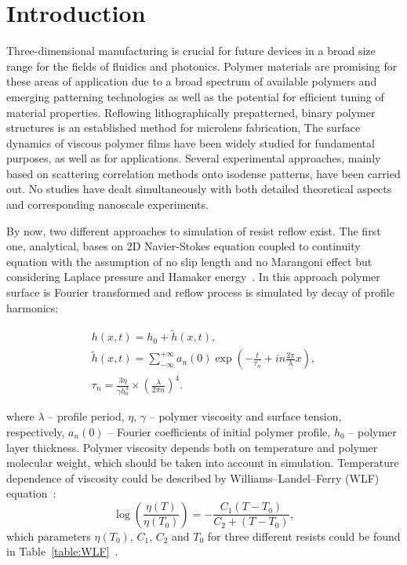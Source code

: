 \documentclass[12pt]{iopart}
\begin{document}
\section{Introduction}

Three-dimensional manufacturing is crucial for future devices in a broad size range for the fields of fluidics and photonics. Polymer materials are promising for these areas of application due to a broad spectrum of available polymers and emerging patterning technologies as well as the potential for efﬁcient tuning of material properties. Reﬂowing lithographically prepatterned, binary polymer structures is an established method for microlens fabrication,
The surface dynamics of viscous polymer films have been widely studied for fundamental purposes, as well as for applications. Several experimental approaches, mainly based on scattering correlation methods onto isodense patterns, have been carried out. No studies have dealt simultaneously with both detailed theoretical aspects and corresponding nanoscale experiments.

By now, two different approaches to simulation of resist reflow exist. The first one, analytical, bases on 2D Navier-Stokes equation coupled to continuity equation with the assumption of no slip length and no Marangoni effect but considering Laplace pressure and Hamaker energy~\cite{Leveder_2010}. In this approach polymer surface is Fourier transformed and reflow process is simulated by decay of profile harmonics:

\begin{eqnarray}
	h(x, t) = h_0 + \tilde{h}(x, t),\\
	\tilde{h}(x, t) = \sum_{-\infty}^{+\infty} a_n(0) \exp \left(-\frac{t}{\tau_n}+i n \frac{2 \pi}{\lambda} x \right),\\
	\tau_n = \frac{3 \eta}{\gamma h_0^3} \times \left( \frac{\lambda}{2 \pi n} \right)^4.
\end{eqnarray}

where $\lambda$ -- profile period, $\eta$, $\gamma$ -- polymer viscosity and surface tension, respectively, $a_n(0)$ -- Fourier coefficients of initial polymer profile, $h_0$ -- polymer layer thickness. Polymer viscosity depends both on temperature and polymer molecular weight, which should be taken into account in simulation. Temperature dependence of viscosity could be described by Williams–Landel–Ferry (WLF) equation~\cite{bird1987dynamics_WLF}:
\begin{equation} \label{eq:WLF}
	\log \left( \frac{\eta(T)}{\eta(T_0)} \right) = -\frac{C_1(T-T_0)}{C_2+(T-T_0)},
\end{equation}
which parameters $\eta(T_0)$, $C_1$, $C_2$ and $T_0$ for three different resists could be found in Table~\ref{table:WLF}~\cite{aho2008measurement_WLF}.
\end{document}

